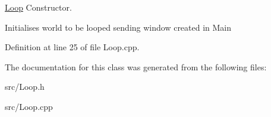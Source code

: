 \hyperlink{classLoop}{Loop} Constructor. 

Initialises world to be looped sending window created in Main 

Definition at line 25 of file Loop.\-cpp.



The documentation for this class was generated from the following files\-:\begin{DoxyCompactItemize}
\item 
src/Loop.\-h\item 
src/Loop.\-cpp\end{DoxyCompactItemize}
